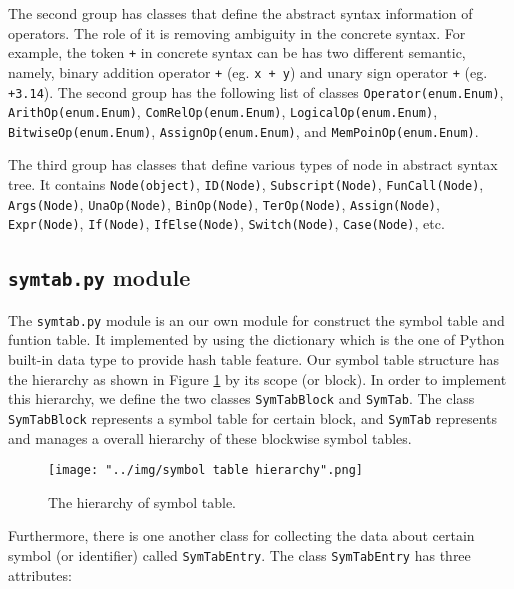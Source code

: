 \documentclass{article}
\newcommand{\code}[1]{\texttt{#1}}
\begin{document}
	The second group has classes that define the abstract syntax information of operators. The role of it is removing ambiguity in the concrete syntax. For example, the token \code{+} in concrete syntax can be has two different semantic, namely, binary addition operator \code{+} (eg. \code{x + y}) and unary sign operator \code{+} (eg. \code{+3.14}). The second group has the following list of classes \code{Operator(enum.Enum)}, \code{ArithOp(enum.Enum)}, \code{ComRelOp(enum.Enum)}, \code{LogicalOp(enum.Enum)}, \code{BitwiseOp(enum.Enum)}, \code{AssignOp(enum.Enum)}, and \code{MemPoinOp(enum.Enum)}.
	
	The third group has classes that define various types of node in abstract syntax tree. It contains \code{Node(object)}, \code{ID(Node)}, \code{Subscript(Node)}, \code{FunCall(Node)}, \code{Args(Node)}, \code{UnaOp(Node)}, \code{BinOp(Node)}, \code{TerOp(Node)}, \code{Assign(Node)}, \code{Expr(Node)}, \code{If(Node)}, \code{IfElse(Node)}, \code{Switch(Node)}, \code{Case(Node)}, etc.
	
	\subsection{\code{symtab.py} module}
	
	The \code{symtab.py} module is an our own module for construct the symbol table and funtion table. It implemented by using the dictionary which is the one of Python built-in data type to provide hash table feature. Our symbol table structure has the hierarchy as shown in Figure \ref{fig: hierarchy of symbol table} by its scope (or block). In order to implement this hierarchy, we define the two classes \code{SymTabBlock} and \code{SymTab}. The class \code{SymTabBlock} represents a symbol table for certain block, and \code{SymTab} represents and manages a overall hierarchy of these blockwise symbol tables.
	
	\begin{figure}[ht]
		\centering
		\texttt{[image: "../img/symbol table hierarchy".png]}
		\caption{The hierarchy of symbol table. \cite{Aho:2006:CPT:1177220}}
		\label{fig: hierarchy of symbol table}
	\end{figure}
	
	Furthermore, there is one another class for collecting the data about certain symbol (or identifier) called \code{SymTabEntry}. The class \code{SymTabEntry} has three attributes:
	
\end{document}
